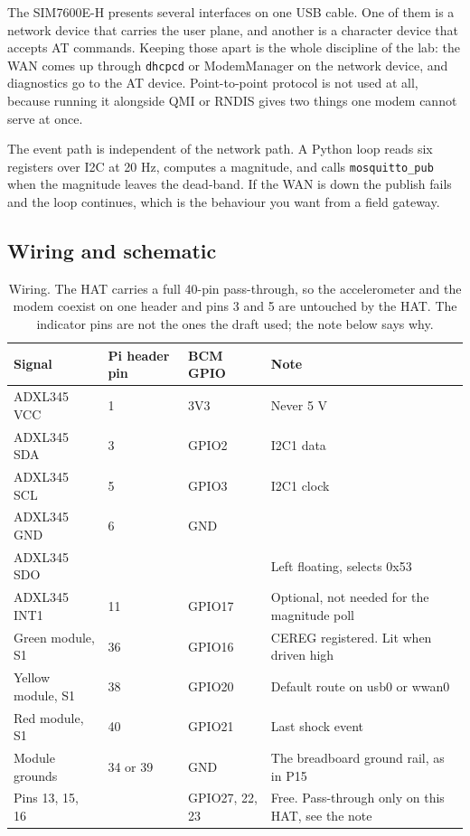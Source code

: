 The SIM7600E-H presents several interfaces on one USB cable. One of them is a network device that carries the user plane, and another is a character device that accepts AT commands. Keeping those apart is the whole discipline of the lab: the WAN comes up through \texttt{dhcpcd} or ModemManager on the network device, and diagnostics go to the AT device. Point-to-point protocol is not used at all, because running it alongside QMI or RNDIS gives two things one modem cannot serve at once.

The event path is independent of the network path. A Python loop reads six registers over I2C at 20 Hz, computes a magnitude, and calls \texttt{mosquitto\_pub} when the magnitude leaves the dead-band. If the WAN is down the publish fails and the loop continues, which is the behaviour you want from a field gateway.

\subsection*{Wiring and schematic}


\begin{table}[H]\centering\small
\begin{tabular}{p{42mm}p{26mm}p{22mm}p{58mm}}
\toprule
Signal & Pi header pin & BCM GPIO & Note \\
\midrule
ADXL345 VCC & 1 & 3V3 & Never 5 V \\
ADXL345 SDA & 3 & GPIO2 & I2C1 data \\
ADXL345 SCL & 5 & GPIO3 & I2C1 clock \\
ADXL345 GND & 6 & GND & \\
ADXL345 SDO & & & Left floating, selects 0x53 \\
ADXL345 INT1 & 11 & GPIO17 & Optional, not needed for the magnitude poll \\
Green module, S1 & 36 & GPIO16 & CEREG registered. Lit when driven high \\
Yellow module, S1 & 38 & GPIO20 & Default route on usb0 or wwan0 \\
Red module, S1 & 40 & GPIO21 & Last shock event \\
Module grounds & 34 or 39 & GND & The breadboard ground rail, as in P15 \\
Pins 13, 15, 16 & & GPIO27, 22, 23 & Free. Pass-through only on this HAT, see the note \\
\bottomrule
\end{tabular}
\caption{Wiring. The HAT carries a full 40-pin pass-through, so the accelerometer and the modem coexist on one header and pins 3 and 5 are untouched by the HAT. The indicator pins are not the ones the draft used; the note below says why.}
\end{table}

